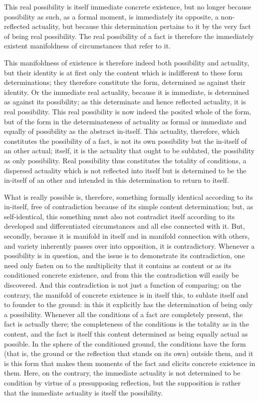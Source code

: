 This real possibility is itself immediate concrete existence,
but no longer because possibility as such, as a formal moment,
is immediately its opposite, a non-reflected actuality,
but because this determination pertains to it
by the very fact of being real possibility.
The real possibility of a fact is therefore
the immediately existent manifoldness of
circumstances that refer to it.

This manifoldness of existence is therefore indeed
both possibility and actuality,
but their identity is at first only the content
which is indifferent to these form determinations;
they therefore constitute the form,
determined as against their identity.
Or the immediate real actuality, because it is immediate,
is determined as against its possibility;
as this determinate and hence reflected actuality,
it is real possibility.
This real possibility is now indeed the posited whole of the form,
but of the form in the determinateness of actuality as formal
or immediate and equally of possibility as the abstract in-itself.
This actuality, therefore, which constitutes the possibility of a fact,
is not its own possibility but the in-itself of an other actual;
itself, it is the actuality that ought to be sublated,
the possibility as only possibility.
Real possibility thus constitutes the totality of conditions,
a dispersed actuality which is not reflected into itself
but is determined to be the in-itself of an other
and intended in this determination to return to itself.

What is really possible is, therefore,
something formally identical according to its in-itself,
free of contradiction because of its simple content determination;
but, as self-identical, this something must also not contradict
itself according to its developed and differentiated circumstances and all
else connected with it.
But, secondly, because it is manifold in itself
and in manifold connection with others,
and variety inherently passes over into opposition,
it is contradictory.
Whenever a possibility is in question,
and the issue is to demonstrate its contradiction,
one need only fasten on to the multiplicity that it contains as content
or as its conditioned concrete existence,
and from this the contradiction will easily be discovered.
And this contradiction is not just a function of comparing;
on the contrary, the manifold of concrete existence is in itself this,
to sublate itself and to founder to the ground:
in this it explicitly has the determination of
being only a possibility.
Whenever all the conditions of a fact are completely present,
the fact is actually there;
the completeness of the conditions is
the totality as in the content,
and the fact is itself this content determined
as being equally actual as possible.
In the sphere of the conditioned ground,
the conditions have the form
(that is, the ground or the reflection that stands on its own)
outside them,
and it is this form that makes them moments
of the fact and elicits concrete existence in them.
Here, on the contrary, the immediate actuality is
not determined to be condition by virtue of
a presupposing reflection,
but the supposition is rather that the immediate actuality is
itself the possibility.

